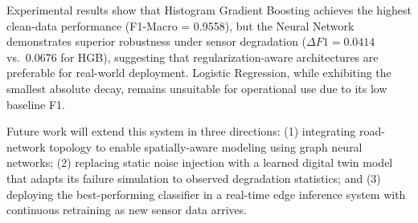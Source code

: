 \documentclass[conference,onecolumn,12pt]{IEEEtran}
\begin{document}
Experimental results show that Histogram Gradient Boosting achieves the
highest clean-data performance (F1-Macro = 0.9558), but the Neural Network
demonstrates superior robustness under sensor degradation ($\Delta F1 =
0.0414$ vs.\ 0.0676 for HGB), suggesting that regularization-aware
architectures are preferable for real-world deployment. Logistic Regression,
while exhibiting the smallest absolute decay, remains unsuitable for
operational use due to its low baseline F1.

Future work will extend this system in three directions: (1) integrating
road-network topology to enable spatially-aware modeling using graph neural
networks; (2) replacing static noise injection with a learned digital twin
model that adapts its failure simulation to observed degradation statistics;
and (3) deploying the best-performing classifier in a real-time edge inference
system with continuous retraining as new sensor data arrives.
\end{document}
